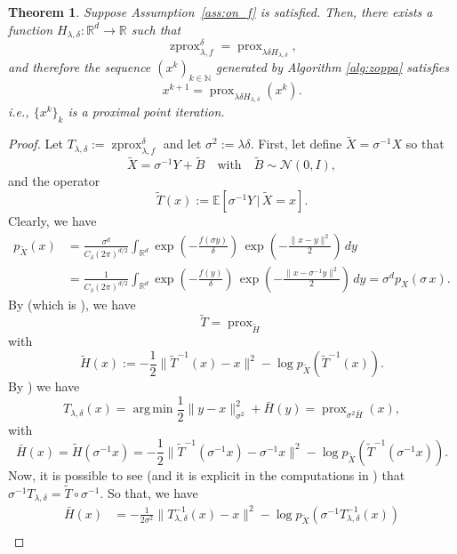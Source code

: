 \documentclass{article}
\newtheorem{theorem}{Theorem}
\newcommand{\R}{\mathbb{R}}
\newcommand{\prox}{\ensuremath{\operatorname{prox}}}
\newcommand{\zprox}{\ensuremath{\operatorname{zprox}}}
\DeclareMathOperator*{\argmin}{arg\,min}
\begin{document}
\begin{theorem}
    Suppose Assumption~\ref{ass:on_f} is satisfied. Then, there exists a function $H_{\lambda,\delta}:\R^d \to \R$ such that
    \begin{equation}\label{eq:Zprox_is_prox}
    \zprox^{\delta}_{\lambda, f}= \prox_{\lambda \delta H_{\lambda,\delta}},
\end{equation}
and therefore the sequence $(x^k)_{k\in\mathbb{N}}$ generated by Algorithm \ref{alg:zoppa} satisfies
\begin{equation}\label{eq:Zprox_is_prox_alg}
    x^{k+1} = \prox_{\lambda \delta H_{\lambda,\delta}} (x^k).
\end{equation}
i.e., $\{x^k\}_k$ is a proximal point iteration.
\end{theorem}
\begin{proof} Let $T_{\lambda,\delta}:= \zprox_{\lambda,f}^\delta$ and let $\sigma^2 := \lambda \delta$. First, let define $\tilde X = \sigma^{-1} X$ so that \[\tilde X =\sigma^{-1}Y + \tilde B\quad \text{with} \quad \tilde B\sim \mathcal{N}(0,I),\] and the operator \[\tilde T(x):=\mathbb{E}[\sigma^{-1}Y \,|\, \tilde X = x].\]
Clearly, we have
\[\begin{aligned}
p_{\tilde X}(x) & = \frac{\sigma^d}{C_\delta (2\pi)^{d/2} }\int_{\mathbb{R}^d}\exp\!\left(-\frac{f(\sigma y)}{\delta}\right)\,
\exp\!\left(-\frac{\|x-y\|^2}{2}\right)\,dy \\ &=\frac{1}{C_\delta (2\pi)^{d/2} }\int_{\mathbb{R}^d}\exp\!\left(-\frac{f(y)}{\delta}\right)\,
\exp\!\left(-\frac{\|x-\sigma^{-1}y\|^2}{2}\right)\,dy = \sigma^{d}p_{X}(\sigma \, x).
\end{aligned}\]
By \cite[Theorem 1 (3)]{Gribonval2013} (which is \cite[Theorem 1 (2)]{Gribonval11}), we have
\[\tilde T = \prox_{\tilde H}\]
with 
\[\tilde H(x) := - \frac{1}{2} \|\tilde T ^{-1} (x) - x\|^2-\log p_{\tilde X} (\tilde T^{-1}(x)).\] 
By \cite[Corollary 1 (3)]{Gribonval2013}) we have
\[T_{\lambda,\delta}(x) = \argmin \frac{1}{2}\|y-x\|_{\sigma^2}^2 + \bar H(y) =\prox_{\sigma^2 \bar H}(x),\]
with 
\[\bar H(x) = \tilde H(\sigma^{-1}x) = - \frac{1}{2} \|\tilde T ^{-1} (\sigma^{-1} x) - \sigma^{-1}x\|^2-\log p_{\tilde X} (\tilde T^{-1}(\sigma^{-1}x)).\]
Now, it is possible to see (and it is explicit in the computations in \cite[Corollary 1]{Gribonval2013}) that $\sigma^{-1}   T_{\lambda,\delta} = \tilde T \circ \sigma^{-1}$. So that, we have
\[\begin{aligned}
    \bar H(x) &= - \frac{1}{2\sigma^2} \| T_{\lambda,\delta} ^{-1} (x) - x\|^2-\log p_{\tilde X} (\sigma^{-1}  T_{\lambda,\delta}^{-1}(x))\\

\end{aligned}\]
\end{proof}
\end{document}
